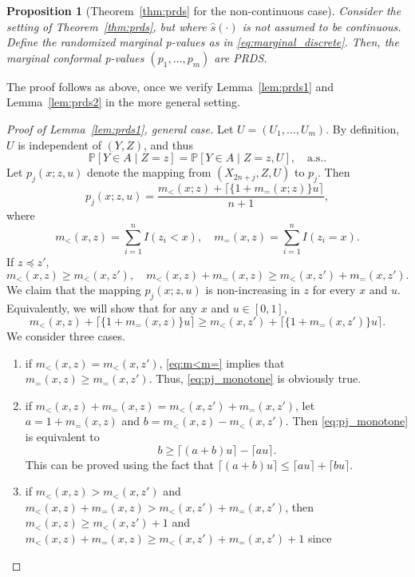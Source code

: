 \documentclass[11pt]{article}
\newtheorem{prop}{Proposition}
\renewcommand{\P}{\mathbb{P}}
\begin{document}
\begin{prop}[Theorem~\ref{thm:prds} for the non-continuous case]
Consider the setting of Theorem~\ref{thm:prds}, but where $\hat{s}(\cdot)$ is not assumed to be continuous. Define the randomized marginal p-values as in \eqref{eq:marginal_discrete}. Then, the marginal conformal p-values $(p_1,\dots,p_m)$ are PRDS.
\end{prop}

The proof follows as above, once we verify Lemma~\ref{lem:prds1} and Lemma~\ref{lem:prds2} in the more general setting.

\begin{proof}[Proof of Lemma~\ref{lem:prds1}, general case]
Let $U = (U_1, \ldots, U_m)$. By definition, $U$ is independent of $(Y, Z)$, and thus
\[\P[Y\in A\mid Z = z] = \P[Y\in A \mid Z = z, U], \quad \text{a.s.}.\]
Let $p_j(x; z, u)$ denote the mapping from $(X_{2n+j}, Z, U)$ to $p_j$. Then 
\[p_j(x; z, u) = \frac{m_{<}(x; z) + \lceil\{1 + m_{=}(x; z)\}u\rceil}{n + 1},\]
where
\[m_{<}(x, z) = \sum_{i=1}^{n}I(z_i < x), \quad m_{=}(x, z) = \sum_{i=1}^{n}I(z_i = x).\]
If $z \preceq z'$,
\begin{equation}\label{eq:m<m=}
m_{<}(x, z)\ge m_{<}(x, z'), \quad m_{<}(x, z) + m_{=}(x, z)\ge m_{<}(x, z') + m_{=}(x, z').
\end{equation}
We claim that the mapping $p_j(x; z, u)$ is non-increasing in $z$ for every $x$ and $u$. Equivalently, we will show that for any $x$ and $u\in [0, 1]$, 
\begin{equation}\label{eq:pj_monotone}
m_{<}(x, z) + \lceil \{1 + m_{=}(x, z)\} u\rceil\ge m_{<}(x, z') + \lceil \{1 + m_{=}(x, z')\}u\rceil.
\end{equation}
We consider three cases. 
\begin{enumerate}[{Case} 1: ]
\item if $m_{<}(x, z) = m_{<}(x, z')$, \eqref{eq:m<m=} implies that $m_{=}(x, z)\ge m_{=}(x, z')$. Thus, \eqref{eq:pj_monotone} is obviously true.
\item if $m_{<}(x, z) + m_{=}(x, z) = m_{<}(x, z') + m_{=}(x, z')$, let $a = 1 + m_{=}(x, z)$ and $b = m_{<}(x, z) - m_{<}(x, z')$. Then \eqref{eq:pj_monotone} is equivalent to
\[b\ge \lceil (a + b)u\rceil - \lceil au\rceil.\]
This can be proved using the fact that $\lceil (a + b)u\rceil \le \lceil au\rceil + \lceil bu\rceil$.
\item if $m_{<}(x, z) > m_{<}(x, z')$ and $m_{<}(x, z) + m_{=}(x, z) > m_{<}(x, z') + m_{=}(x, z')$, then 
$m_{<}(x, z) \ge m_{<}(x, z') + 1$ and $m_{<}(x, z) + m_{=}(x, z) \ge m_{<}(x, z') + m_{=}(x, z') + 1$ since

\end{enumerate}
\end{proof}
\end{document}
